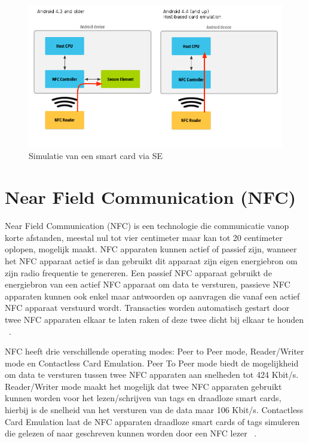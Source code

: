 \begin{figure}
	\includegraphics[width=\linewidth]
	{img/WalletHostBasedCardEmulation}
	\caption{Simulatie van een smart card via SE}
	\label{fig:SE-HCE}
\end{figure}


\section{Near Field Communication (NFC)}
\label{sec:NFC}
Near Field Communication (NFC) is een technologie die communicatie vanop korte afstanden, meestal nul tot vier centimeter maar kan tot 20 centimeter oplopen, mogelijk maakt. NFC apparaten kunnen actief of passief zijn, wanneer het NFC apparaat actief is dan gebruikt dit apparaat zijn eigen energiebron om zijn radio frequentie te genereren. Een passief NFC apparaat gebruikt de energiebron van een actief NFC apparaat om data te versturen, passieve NFC apparaten kunnen ook enkel maar antwoorden op aanvragen die vanaf een actief NFC apparaat verstuurd wordt. Transacties worden automatisch gestart door twee NFC apparaten elkaar te laten raken of deze twee dicht bij elkaar te houden ~\autocite{Alattar2014}. 

NFC heeft drie verschillende operating modes: Peer to Peer mode, Reader/Writer mode en Contactless Card Emulation. Peer To Peer mode biedt de mogelijkheid om data te versturen tussen twee NFC apparaten aan snelheden tot 424 Kbit/s. Reader/Writer mode maakt het mogelijk dat twee NFC apparaten gebruikt kunnen worden voor het lezen/schrijven van tags en draadloze smart cards, hierbij is de snelheid van het versturen van de data maar 106 Kbit/s. Contactless Card Emulation laat de NFC apparaten draadloze smart cards of tags simuleren die gelezen of naar geschreven kunnen worden door een NFC lezer ~\autocite{Alattar2014}. 

